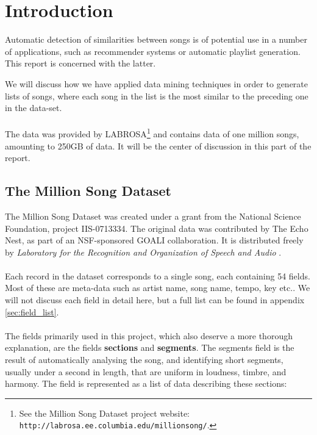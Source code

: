 \section{Introduction} %
\label{sec:introduction}
Automatic detection of similarities between songs is of potential use in a number of applications, such as recommender systems or automatic playlist generation. This report is concerned with the latter.

We will discuss how we have applied data mining techniques in order to generate lists of songs, where each song in the list is the most similar to the preceding one in the data-set.
\\\\
The data was provided by LABROSA\footnote{See the Million Song Dataset project website: \texttt{http://labrosa.ee.columbia.edu/millionsong/}.} and contains data of one million songs, amounting to 250GB of data. It will be the center of discussion in this part of the report.
\subsection{The Million Song Dataset} %
\label{sub:the_million_song_dataset}
The Million Song Dataset was created under a grant from the National Science Foundation, project IIS-0713334. The original data was contributed by The Echo Nest, as part of an NSF-sponsored GOALI collaboration. It is distributed freely by \textit{Laboratory for the Recognition and Organization of Speech and Audio} \citep{bert11}.
\\\\
Each record in the dataset corresponds to a single song, each containing 54 fields. Most of these are meta-data such as artist name, song name, tempo, key etc.. We will not discuss each field in detail here, but a full list can be found in appendix \ref{sec:field_list}.
\\\\
The fields primarily used in this project, which also deserve a more thorough explanation, are the fields \textbf{sections} and \textbf{segments}. The segments field is the result of automatically analysing the song, and identifying short segments, usually under a second in length, that are uniform in loudness, timbre, and harmony. The field is represented as a list of data describing these sections:

